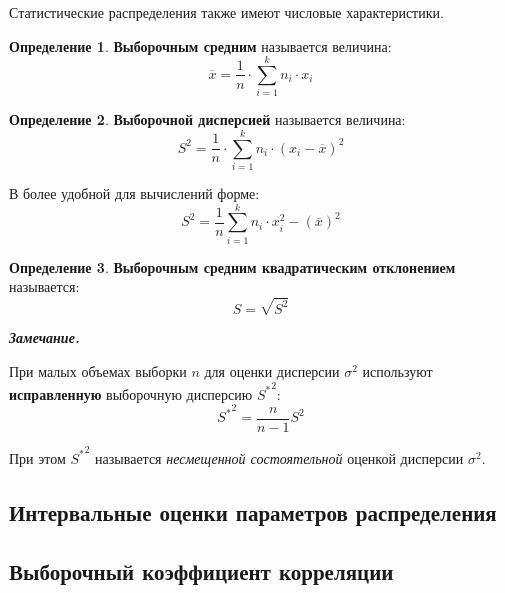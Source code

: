\documentclass[12pt,a4paper]{article}
\theoremstyle{definition}
\newtheorem{definition}{Определение}[section]
\theoremstyle{definition}
\theoremstyle{remark}
\newenvironment{remark}{
  \par\noindent\textbf{\textit{Замечание.}}~
}{\par}
\theoremstyle{corollary}
\theoremstyle{bolditalic}
\begin{document}
Статистические распределения также имеют числовые характеристики.

\begin{definition}
    \textbf{Выборочным средним} называется величина:
    \[
    \overline{x} = \frac{1}{n}\cdot \sum_{i=1}^{k}{n_i\cdot x_i}
    \]
\end{definition}

\begin{definition}
    \textbf{Выборочной дисперсией} называется величина:
    \[
    S^2=\frac{1}{n}\cdot \sum_{i=1}^{k}{n_i\cdot (x_i-\overline{x})^2}
    \]


    В более удобной для вычислений форме:
    \[
    S^2=\frac{1}{n} \sum_{i=1}^{k}{n_i\cdot x_i^2} - (\overline{x})^2
    \]
\end{definition}

\begin{definition}
    \textbf{Выборочным средним квадратическим отклонением} называется:
    \[
    S = \sqrt{S^2}
    \]
\end{definition}

\begin{remark}
    При малых объемах выборки $n$ для оценки дисперсии $\sigma^2$ используют \textbf{исправленную} выборочную дисперсию ${S^*}^2$:
    \[
    {S^*}^2 = \frac{n}{n-1}S^2
    \]

    При этом ${S^*}^2$ называется \textit{несмещенной состоятельной} оценкой дисперсии $\sigma^2$.
\end{remark}

\subsection{Интервальные оценки параметров распределения}

\subsection{Выборочный коэффициент корреляции}



\end{document}
